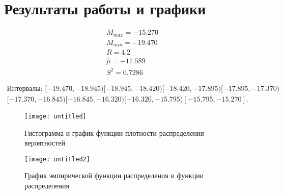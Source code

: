 \section*{Результаты работы и графики}

\begin{align}
M_{max} = -15.270\\
M_{min} = -19.470\\
R = 4.2\\
\hat\mu = -17.589\\
S^2 = 0.7286
\end{align}

\begin{align}
\text{Интервалы: } [-19.470, -18.945) [-18.945, -18.420) [-18.420, -17.895) [-17.895, -17.370)\\ \nonumber
[-17.370, -16.845) [-16.845, -16.320) [-16.320, -15.795) [-15.795, -15.270].
\end{align}

\begin{figure}[h]
\texttt{[image: untitled]}
\caption{Гистограмма и график функции плотности распределения вероятностей}
\label{fig:image}
\end{figure}

\begin{figure}[h]
	\texttt{[image: untitled2]}
	\caption{График эмпирической функции распределения и функции распределения}
	\label{fig:image1}
\end{figure}